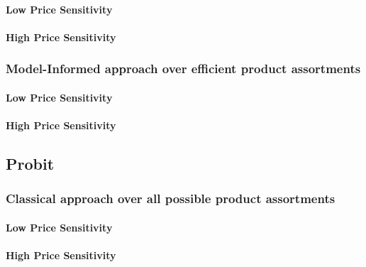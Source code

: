 \paragraph{Low Price Sensitivity}



\paragraph{High Price Sensitivity}



\subsubsection{Model-Informed approach over efficient product assortments}

\paragraph{Low Price Sensitivity}



\paragraph{High Price Sensitivity}



\subsection{Probit}

\subsubsection{Classical approach over all possible product assortments}

\paragraph{Low Price Sensitivity}



\paragraph{High Price Sensitivity}

